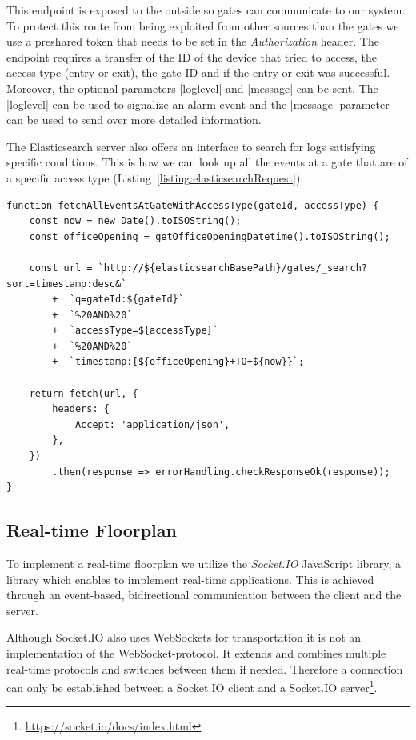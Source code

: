 This endpoint is exposed to the outside so gates can communicate to our system. To protect this route from being exploited from other sources than the gates we use a preshared token that needs to be set in the \emph{Authorization} header.
 The endpoint requires a transfer of the ID of the device that tried to access, the access type (entry or exit), the gate ID and if the entry or exit was successful. Moreover, the optional parameters |loglevel| and |message| can be sent. The |loglevel| can be used to signalize an alarm event and the |message| parameter can be used to send over more detailed information.

The Elasticsearch server also offers an interface to search for logs satisfying specific conditions. This is how we can look up all the events at a gate that are of a specific access type (Listing~\ref{listing:elasticsearchRequest}):

\clearpage

\begin{lstlisting}[label={listing:elasticsearchRequest},caption={Example search request to Elasticsearch server}]
function fetchAllEventsAtGateWithAccessType(gateId, accessType) {
    const now = new Date().toISOString();
    const officeOpening = getOfficeOpeningDatetime().toISOString();

    const url = `http://${elasticsearchBasePath}/gates/_search?sort=timestamp:desc&`
        +  `q=gateId:${gateId}`
        +  `%20AND%20`
        +  `accessType=${accessType}`
        +  `%20AND%20`
        +  `timestamp:[${officeOpening}+TO+${now}}`;
        
    return fetch(url, {
        headers: {
            Accept: 'application/json',
        },
    })
        .then(response => errorHandling.checkResponseOk(response));
}
\end{lstlisting}

\subsection{Real-time Floorplan}
\label{Real-time Floorplan}

To implement a real-time floorplan we utilize the \emph{Socket.IO} JavaScript library, a library which enables to implement real-time applications. This is achieved through an event-based, bidirectional communication between the client and the server. 

Although Socket.IO also uses WebSockets for transportation it is not an implementation of the WebSocket-protocol. It extends and combines multiple real-time protocols and switches between them if needed. Therefore a connection can only be established between a Socket.IO client and a Socket.IO server\footnote{\url{https://socket.io/docs/index.html}}.


